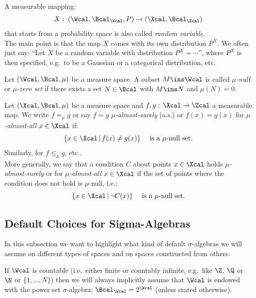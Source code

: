 \begin{Def}
    A measurable mapping: \[X:\; (\Wcal,\Bcal_\Wcal,P) \to (\Xcal,\Bcal_\Xcal)\] 
    that starts from a probability space is also called \emph{random variable}.\\
    The main point is that the map $X$ comes with its own distribution $P^X$.
    We often just say: ``Let $X$ be a random variable with distribution $P^X = \cdots$'',
    where $P^X$ is then specified, e.g.\ to be a Gaussian or a categorical distribution, etc.
\end{Def}


\begin{Def}
    Let $(\Wcal,\Bcal,\mu)$ be a measure space.
    A subset $M \ins \Wcal$ is called \emph{$\mu$-null} or \emph{$\mu$-zero set} if there exists a set $N \in \Bcal$ with $M \ins N$ and $\mu(N)=0$.
\end{Def}

\begin{Def}
    Let $(\Xcal,\Bcal,\mu)$ be a measure space and $f,g:\,\Xcal \to \Zcal$ a measurable map.
    We write $f=_\mu g$ or say $f=g$ \emph{$\mu$-almost-surely} (a.s.) or $f(x)=g(x)$ for \emph{$\mu$-almost-all} $x \in \Xcal$ 
    if:  
    \[\{ x \in \Xcal\,|\,f(x)\neq g(x) \} \quad \text{ is a $\mu$-null set.} \]
    Similarly, for $f\le_\mu g$, etc.. \\
    More generally,  we say that a condition $C$ about points $x \in \Xcal$ holds \emph{$\mu$-almost-surely} or for \emph{$\mu$-almost-all} $x \in \Xcal$ if the set of points where the condition does not hold is $\mu$-null, i.e.:
    \[\{ x \in \Xcal\,|\,\neg C(x) \} \quad \text{ is a $\mu$-null set}. \]
\end{Def}

\subsection{Default Choices for Sigma-Algebras}


In this subsection we want to highlight what kind of default $\sigma$-algebras we will assume 
on different types of spaces and on spaces constructed from others.

\begin{Rem}
    If $\Wcal$ is countable (i.e.\ either finite or countably infinite, e.g.\ like $\Z$, $\Q$ or  $\N$ or $\{1,\dots,N\}$) 
    then we will always implicitly assume that $\Wcal$ is endowed with the power set $\sigma$-algebra: $\Bcal_\Wcal = 2^\Wcal$ (unless stated otherwise).
\end{Rem}


